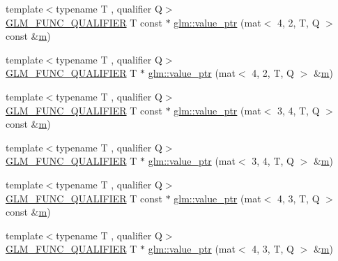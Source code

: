\begin{DoxyCompactItemize}
\item 
{\footnotesize template$<$typename T , qualifier Q$>$ }\\\mbox{\hyperlink{setup_8hpp_a33fdea6f91c5f834105f7415e2a64407}{G\+L\+M\+\_\+\+F\+U\+N\+C\+\_\+\+Q\+U\+A\+L\+I\+F\+I\+ER}} T const  $\ast$ \mbox{\hyperlink{group__gtc__type__ptr_gaf8be997c8fa6dea9773f195e35f2df05}{glm\+::value\+\_\+ptr}} (mat$<$ 4, 2, T, Q $>$ const \&\mbox{\hyperlink{_s_d_l__opengl__glext_8h_af593500c283bf1a787a6f947f503a5c2}{m}})
\item 
{\footnotesize template$<$typename T , qualifier Q$>$ }\\\mbox{\hyperlink{setup_8hpp_a33fdea6f91c5f834105f7415e2a64407}{G\+L\+M\+\_\+\+F\+U\+N\+C\+\_\+\+Q\+U\+A\+L\+I\+F\+I\+ER}} T $\ast$ \mbox{\hyperlink{group__gtc__type__ptr_gabf9cfd331a42dd9feb54a5cbc858509a}{glm\+::value\+\_\+ptr}} (mat$<$ 4, 2, T, Q $>$ \&\mbox{\hyperlink{_s_d_l__opengl__glext_8h_af593500c283bf1a787a6f947f503a5c2}{m}})
\item 
{\footnotesize template$<$typename T , qualifier Q$>$ }\\\mbox{\hyperlink{setup_8hpp_a33fdea6f91c5f834105f7415e2a64407}{G\+L\+M\+\_\+\+F\+U\+N\+C\+\_\+\+Q\+U\+A\+L\+I\+F\+I\+ER}} T const  $\ast$ \mbox{\hyperlink{group__gtc__type__ptr_gaf93bd83ae6520e9cdafdcd3f483dfeb3}{glm\+::value\+\_\+ptr}} (mat$<$ 3, 4, T, Q $>$ const \&\mbox{\hyperlink{_s_d_l__opengl__glext_8h_af593500c283bf1a787a6f947f503a5c2}{m}})
\item 
{\footnotesize template$<$typename T , qualifier Q$>$ }\\\mbox{\hyperlink{setup_8hpp_a33fdea6f91c5f834105f7415e2a64407}{G\+L\+M\+\_\+\+F\+U\+N\+C\+\_\+\+Q\+U\+A\+L\+I\+F\+I\+ER}} T $\ast$ \mbox{\hyperlink{group__gtc__type__ptr_ga9b9841a59cedf4f06882863900c36787}{glm\+::value\+\_\+ptr}} (mat$<$ 3, 4, T, Q $>$ \&\mbox{\hyperlink{_s_d_l__opengl__glext_8h_af593500c283bf1a787a6f947f503a5c2}{m}})
\item 
{\footnotesize template$<$typename T , qualifier Q$>$ }\\\mbox{\hyperlink{setup_8hpp_a33fdea6f91c5f834105f7415e2a64407}{G\+L\+M\+\_\+\+F\+U\+N\+C\+\_\+\+Q\+U\+A\+L\+I\+F\+I\+ER}} T const  $\ast$ \mbox{\hyperlink{group__gtc__type__ptr_ga50654758b47589e7dea0aa0bcb50adfb}{glm\+::value\+\_\+ptr}} (mat$<$ 4, 3, T, Q $>$ const \&\mbox{\hyperlink{_s_d_l__opengl__glext_8h_af593500c283bf1a787a6f947f503a5c2}{m}})
\item 
{\footnotesize template$<$typename T , qualifier Q$>$ }\\\mbox{\hyperlink{setup_8hpp_a33fdea6f91c5f834105f7415e2a64407}{G\+L\+M\+\_\+\+F\+U\+N\+C\+\_\+\+Q\+U\+A\+L\+I\+F\+I\+ER}} T $\ast$ \mbox{\hyperlink{group__gtc__type__ptr_gad33202dd8b191c31df6ed81b63bc2e52}{glm\+::value\+\_\+ptr}} (mat$<$ 4, 3, T, Q $>$ \&\mbox{\hyperlink{_s_d_l__opengl__glext_8h_af593500c283bf1a787a6f947f503a5c2}{m}})

\end{DoxyCompactItemize}
